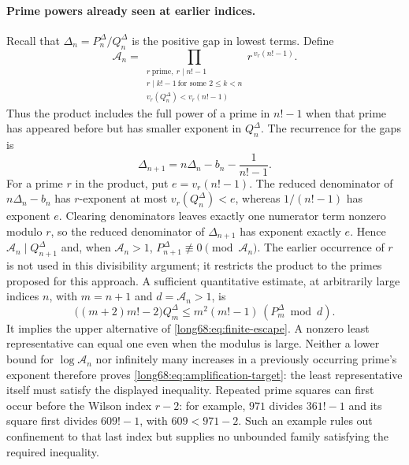 \paragraph{Prime powers already seen at earlier indices.}
Recall that $\Delta_n=P^\Delta_n/Q^\Delta_n$ is the positive gap in lowest terms. Define
\[
 \mathcal A_n=\prod_{\substack{r\ \mathrm{prime},\ r\mid n!-1\\
     r\mid k!-1\ \text{for some }2\le k<n\\
     v_r(Q^\Delta_n)<v_r(n!-1)}}r^{\,v_r(n!-1)} .
\]
Thus the product includes the full power of a prime in $n!-1$ when that
prime has appeared before but has smaller exponent in $Q^\Delta_n$.
The recurrence for the gaps is
\[
 \Delta_{n+1}=n\Delta_n-b_n-\frac1{n!-1}.
\]
For a prime $r$ in the product, put $e=v_r(n!-1)$. The reduced denominator
of $n\Delta_n-b_n$ has $r$-exponent at most $v_r(Q^\Delta_n)<e$, whereas
$1/(n!-1)$ has exponent $e$. Clearing denominators leaves exactly one
numerator term nonzero modulo $r$, so the reduced denominator of
$\Delta_{n+1}$ has exponent exactly $e$. Hence
$\mathcal A_n\mid Q^\Delta_{n+1}$ and, when $\mathcal A_n>1$,
$P^\Delta_{n+1}\not\equiv0\pmod{\mathcal A_n}$.
The earlier occurrence of $r$ is not used in this divisibility argument;
it restricts the product to the primes proposed for this approach.
A sufficient quantitative estimate, at arbitrarily large indices $n$,
with $m=n+1$ and $d=\mathcal A_n>1$, is
\begin{equation}\label{long68:eq:amplification-target}
 \bigl((m+2)m!-2\bigr)Q^\Delta_m
 \le m^2(m!-1)\,(P^\Delta_m\bmod d).
\end{equation}
It implies the upper alternative of \eqref{long68:eq:finite-escape}. A nonzero
least representative can equal one even when the modulus is large.
Neither a lower bound for $\log\mathcal A_n$ nor infinitely many increases
in a previously occurring prime's exponent therefore proves
\eqref{long68:eq:amplification-target}: the least representative itself
must satisfy the displayed inequality. Repeated prime squares
can first occur before the Wilson index $r-2$: for example, $971$ divides
$361!-1$ and its square first divides $609!-1$, with $609<971-2$. Such an
example rules out confinement to that last index but supplies no unbounded
family satisfying the required inequality.

